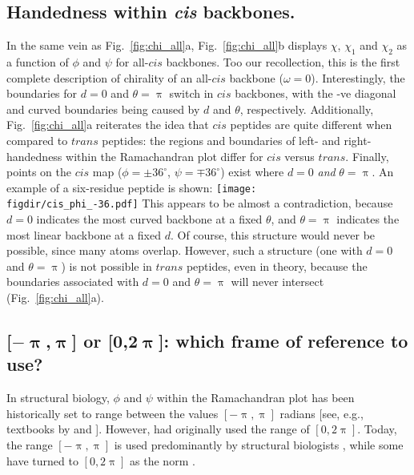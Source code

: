 \documentclass[fleqn,10pt]{wlpeerj} %
\newcommand{\Fig}[1]{Fig.~\ref{#1}}
\newcommand{\figdir}{./figures}
\begin{document}
\subsection*{Handedness within \textit{cis} backbones.}
In the same vein as \Fig{fig:chi_all}a, \Fig{fig:chi_all}b displays $\chi$, $\chi_1$ and $\chi_2$ as a function of $\phi$ and $\psi$ for all-$cis$ backbones. Too our recollection, this is the first complete description of chirality of an all-$cis$ backbone ($\omega=0$). Interestingly, the boundaries for $d=0$ and $\theta=\uppi$ switch in $cis$ backbones, with the -ve diagonal and curved boundaries being caused by $d$ and $\theta$, respectively. Additionally, \Fig{fig:chi_all}a reiterates the idea that $cis$ peptides are quite different when compared to $trans$ peptides: the regions and boundaries of left- and right-handedness within the Ramachandran plot differ for $cis$ versus $trans$. Finally, points on the $cis$ map ($\phi=\pm36^\circ$, $\psi=\mp36^\circ$) exist where $d=0$ {\em and} $\theta=\uppi$. An example of a six-residue peptide is shown:\newline
\mbox{}\hfill\texttt{[image: \\figdir/cis\_phi\_-36.pdf]}\hfill\mbox{}\newline
This appears to be almost a contradiction, because $d=0$ indicates the most curved backbone at a fixed $\theta$, and $\theta=\uppi$ indicates the most linear backbone at a fixed $d$. Of course, this structure would never be possible, since many atoms overlap. However, such a structure (one with $d=0$ and $\theta=\uppi$) is not possible in $trans$ peptides, even in theory, because the boundaries associated with $d=0$ and $\theta=\uppi$ will never intersect (\Fig{fig:chi_all}a). 

\subsection*{[$\bm{-\uppi}$,$\bm{\uppi}$] or [$\bm{0}$,$\bm{2\uppi}$]: which frame of reference to use?} 
In structural biology, $\phi$ and $\psi$ within the Ramachandran plot has been historically set to range between the values $[-\uppi,\uppi]$ radians [see, e.g., textbooks by \cite{Berg2006} and \cite{Alberts2002}]. However, \cite{Ramachandran1963} had originally used the range of $[0,2\uppi]$. Today, the range $[-\uppi,\uppi]$ is used predominantly by structural biologists \citep{Laskowski1993,Laskowski2003,Zacharias2013}, while some have turned to $[0,2\uppi]$ as the norm \citep{Nemethy1966,Voelz2011}. 
\end{document}
